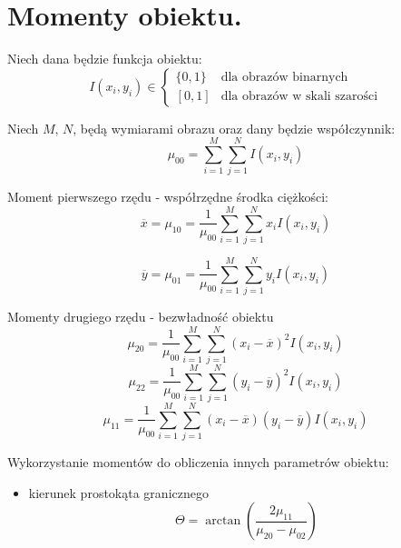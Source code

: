 \documentclass[a4paper,10pt]{article}
\begin{document}
\section{Momenty obiektu.}
Niech dana będzie funkcja obiektu:
\begin{equation}
 I(x_i, y_i) \in 
\begin{cases}
 \{0, 1\} & \mbox{dla obrazów binarnych}\\
 \left[0, 1\right] & \mbox{dla obrazów w skali szarości}
\end{cases}
\end{equation}

Niech $M$, $N$, będą wymiarami obrazu oraz dany będzie współczynnik:
\begin{equation}
  \mu_{00} = \sum_{i=1}^{M} \sum_{j=1}^{N} I(x_i, y_i)
\end{equation}

Moment pierwszego rzędu - współrzędne środka ciężkości:
\begin{equation}
  \overline{x} = \mu_{10} = \frac{1}{\mu_{00}} \sum_{i=1}^{M} \sum_{j=1}^{N} x_i I(x_i, y_i)
\end{equation}

\begin{equation}
  \overline{y} = \mu_{01} = \frac{1}{\mu_{00}} \sum_{i=1}^{M} \sum_{j=1}^{N} y_i I(x_i, y_i)
\end{equation}

Momenty drugiego rzędu - bezwładność obiektu
\begin{equation}
  \mu_{20} = \frac{1}{\mu_{00}} \sum_{i=1}^{M} \sum_{j=1}^{N} (x_i - \overline{x})^2 I(x_i, y_i)
\end{equation}
\begin{equation}
  \mu_{22} = \frac{1}{\mu_{00}} \sum_{i=1}^{M} \sum_{j=1}^{N} (y_i - \overline{y})^2 I(x_i, y_i)
\end{equation}
\begin{equation}
  \mu_{11} = \frac{1}{\mu_{00}} \sum_{i=1}^{M} \sum_{j=1}^{N} (x_i - \overline{x})(y_i - \overline{y}) I(x_i, y_i)
\end{equation}

Wykorzystanie momentów do obliczenia innych parametrów obiektu:
\begin{itemize}
 \item kierunek prostokąta granicznego
 \begin{equation}
   \Theta = \arctan \left(\frac{2 \mu_{11}}{\mu_{20} - \mu_{02}}\right)
 \end{equation}
\end{itemize}
\end{document}
